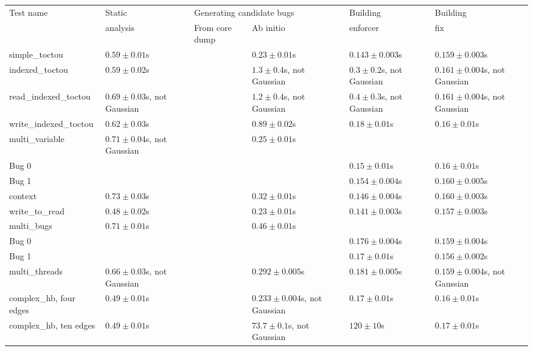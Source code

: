 \begin{tabular}{l|p{3.6cm}|p{3.6cm}|p{3.6cm}|p{3.6cm}|p{3.6cm}}
Test name              & Static                  & \multicolumn{2}{l|}{Generating candidate bugs} & Building & Building \\
\cline{3-4}            & analysis                & From core dump & Ab initio                     & enforcer & fix      \\
\hline
\hline{}simple\_toctou         & $0.59 \pm 0.01$s     &        & $0.23 \pm 0.01$s     & $0.143 \pm 0.003$s   & $0.159 \pm 0.003$s   \\
\hline{}indexed\_toctou        & $0.59 \pm 0.02$s     &        & $1.3 \pm 0.4$s, not Gaussian & $0.3 \pm 0.2$s, not Gaussian & $0.161 \pm 0.004$s, not Gaussian \\
\hline{}read\_indexed\_toctou  & $0.69 \pm 0.03$s, not Gaussian &        & $1.2 \pm 0.4$s, not Gaussian & $0.4 \pm 0.3$s, not Gaussian & $0.161 \pm 0.004$s, not Gaussian \\
\hline{}write\_indexed\_toctou & $0.62 \pm 0.03$s     &        & $0.89 \pm 0.02$s     & $0.18 \pm 0.01$s     & $0.16 \pm 0.01$s     \\
\hline{}multi\_variable        & $0.71 \pm 0.04$s, not Gaussian &        & $0.25 \pm 0.01$s     & \\
\hspace{20pt}Bug 0     & & & & $0.15 \pm 0.01$s     & $0.16 \pm 0.01$s     \\
\hspace{20pt}Bug 1     & & & & $0.154 \pm 0.004$s   & $0.160 \pm 0.005$s   \\
\hline{}context                & $0.73 \pm 0.03$s     &        & $0.32 \pm 0.01$s     & $0.146 \pm 0.004$s   & $0.160 \pm 0.003$s   \\
\hline{}write\_to\_read        & $0.48 \pm 0.02$s     &        & $0.23 \pm 0.01$s     & $0.141 \pm 0.003$s   & $0.157 \pm 0.003$s   \\
\hline{}multi\_bugs            & $0.71 \pm 0.01$s     &        & $0.46 \pm 0.01$s     & \\
\hspace{20pt}Bug 0     & & & & $0.176 \pm 0.004$s   & $0.159 \pm 0.004$s   \\
\hspace{20pt}Bug 1     & & & & $0.17 \pm 0.01$s     & $0.156 \pm 0.002$s   \\
\hline{}multi\_threads         & $0.66 \pm 0.03$s, not Gaussian &        & $0.292 \pm 0.005$s   & $0.181 \pm 0.005$s   & $0.159 \pm 0.004$s, not Gaussian \\
\hline{}complex\_hb, four edges & $0.49 \pm 0.01$s     &        & $0.233 \pm 0.004$s, not Gaussian & $0.17 \pm 0.01$s     & $0.16 \pm 0.01$s     \\
\hline{}complex\_hb, ten edges & $0.49 \pm 0.01$s     &        & $73.7 \pm 0.1$s, not Gaussian & $120 \pm 10$s        & $0.17 \pm 0.01$s     \\
\end{tabular}
